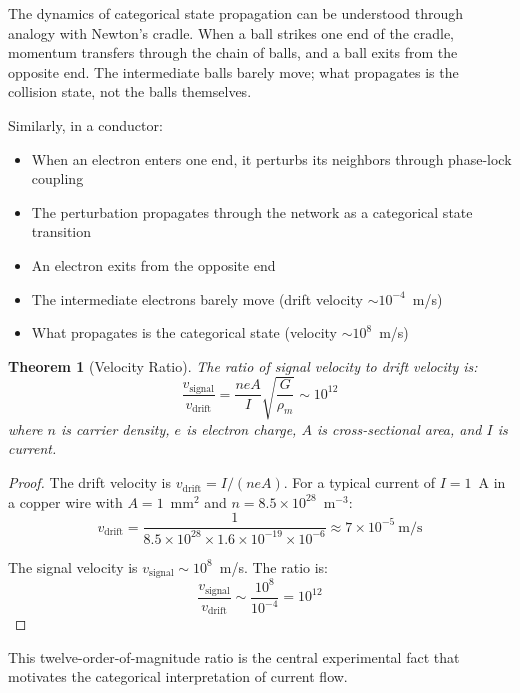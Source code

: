 \documentclass[twocolumn,showpacs,preprintnumbers,amsmath,amssymb,prd]{revtex4-2}
\newtheorem{theorem}{Theorem}[section]
\begin{document}
The dynamics of categorical state propagation can be understood through analogy with Newton's cradle. When a ball strikes one end of the cradle, momentum transfers through the chain of balls, and a ball exits from the opposite end. The intermediate balls barely move; what propagates is the collision state, not the balls themselves.

Similarly, in a conductor:
\begin{itemize}
\item When an electron enters one end, it perturbs its neighbors through phase-lock coupling
\item The perturbation propagates through the network as a categorical state transition
\item An electron exits from the opposite end
\item The intermediate electrons barely move (drift velocity $\sim 10^{-4}$~m/s)
\item What propagates is the categorical state (velocity $\sim 10^8$~m/s)
\end{itemize}

\begin{theorem}[Velocity Ratio]
\label{thm:velocity_ratio}
The ratio of signal velocity to drift velocity is:
\begin{equation}
\frac{v_{\text{signal}}}{v_{\text{drift}}} = \frac{n e A}{I} \sqrt{\frac{G}{\rho_m}} \sim 10^{12}
\label{eq:velocity_ratio}
\end{equation}
where $n$ is carrier density, $e$ is electron charge, $A$ is cross-sectional area, and $I$ is current.
\end{theorem}

\begin{proof}
The drift velocity is $v_{\text{drift}} = I/(neA)$. For a typical current of $I = 1$~A in a copper wire with $A = 1$~mm$^2$ and $n = 8.5 \times 10^{28}$~m$^{-3}$:
\begin{equation}
v_{\text{drift}} = \frac{1}{8.5 \times 10^{28} \times 1.6 \times 10^{-19} \times 10^{-6}} \approx 7 \times 10^{-5}~\text{m/s}
\end{equation}

The signal velocity is $v_{\text{signal}} \sim 10^8$~m/s. The ratio is:
\begin{equation}
\frac{v_{\text{signal}}}{v_{\text{drift}}} \sim \frac{10^8}{10^{-4}} = 10^{12}
\end{equation}
\end{proof}

This twelve-order-of-magnitude ratio is the central experimental fact that motivates the categorical interpretation of current flow.
\end{document}
